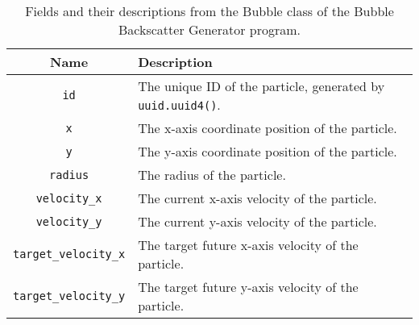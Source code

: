 \begin{table}[H]
    \centering
    \begin{tabularx}{\linewidth}{c | X}
        Name    &   Description\\
        \hline
        \hline
        \texttt{id}          &   The unique ID of the particle, generated by \texttt{uuid.uuid4()}.\\
        \hline
        \texttt{x}                       &   The x-axis coordinate position of the particle.\\
        \hline
        \texttt{y}                       &   The y-axis coordinate position of the particle.\\
        \hline
        \texttt{radius}                  &   The radius of the particle.\\
        \hline
        \texttt{velocity\_x}             &   The current x-axis velocity of the particle.\\
        \hline
        \texttt{velocity\_y}             &   The current y-axis velocity of the particle.\\
        \hline
        \texttt{target\_velocity\_x}     &   The target future x-axis velocity of the particle.\\
        \hline
        \texttt{target\_velocity\_y}     &   The target future y-axis velocity of the particle.\\
        \hline
    \end{tabularx}
    \caption{Fields and their descriptions from the Bubble class of the Bubble Backscatter Generator program.}
    \label{table:simbubbleclassfields}
\end{table}

